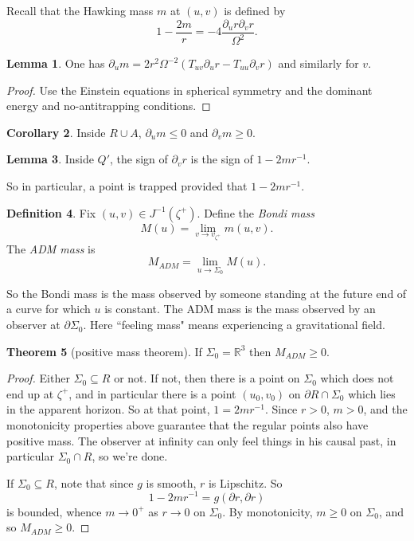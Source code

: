\documentclass[12pt]{report}
\newcommand{\RR}{\mathbb{R}}
\newcommand{\dfn}[1]{\emph{#1}\index{#1}}
\theoremstyle{definition}
\newtheorem{theorem}{Theorem}[chapter]
\newtheorem{lemma}[theorem]{Lemma}
\newtheorem{corollary}[theorem]{Corollary}
\newtheorem{definition}[theorem]{Definition}
\begin{document}
Recall that the Hawking mass $m$ at $(u, v)$ is defined by
$$1 - \frac{2m}{r} = -4 \frac{\partial_ur\partial_vr}{\Omega^2}.$$
\begin{lemma}
    One has $\partial_um = 2r^2\Omega^{-2} (T_{uv}\partial_ur - T_{uu}\partial_vr)$ and similarly for $v$.
\end{lemma}
\begin{proof}
    Use the Einstein equations in spherical symmetry and the dominant energy and no-antitrapping conditions.
\end{proof}
\begin{corollary}
    Inside $R \cup A$, $\partial_um \leq 0$ and $\partial_vm \geq 0$.
\end{corollary}
\begin{lemma}
    Inside $Q'$, the sign of $\partial_vr$ is the sign of $1 - 2mr^{-1}$.
\end{lemma}
    So in particular, a point is trapped provided that $1 - 2mr^{-1}$.
\begin{definition}
    Fix $(u, v) \in J^{-1}(\zeta^+)$. Define the \dfn{Bondi mass}
    $$M(u) = \lim_{v \to v_{\zeta^+}} m(u, v).$$
    The \dfn{ADM mass} is
    $$M_{ADM} = \lim_{u \to \Sigma_0} M(u).$$
\end{definition}
    So the Bondi mass is the mass observed by someone standing at the future end of a curve for which $u$ is constant. The ADM mass is the mass observed by an observer at $\partial \Sigma_0$. Here ``feeling mass" means experiencing a gravitational field.
\begin{theorem}[positive mass theorem]
    If $\Sigma_0 = \RR^3$ then $M_{ADM} \geq 0$.
\end{theorem}
\begin{proof}
    Either $\Sigma_0 \subseteq R$ or not. If not, then there is a point on $\Sigma_0$ which does not end up at $\zeta^+$, and in particular there is a point $(u_0, v_0)$ on $\partial R \cap \Sigma_0$ which lies in the apparent horizon. So at that point, $1 = 2mr^{-1}$. Since $r > 0$, $m > 0$, and the monotonicity properties above guarantee that the regular points also have positive mass. The observer at infinity can only feel things in his causal past, in particular $\Sigma_0 \cap R$, so we're done.

    If $\Sigma_0 \subseteq R$, note that since $g$ is smooth, $r$ is Lipschitz. So
    $$1 - 2mr^{-1} = g(\partial r, \partial r)$$
    is bounded, whence $m \to 0^+$ as $r \to 0$ on $\Sigma_0$. By monotonicity, $m \geq 0$ on $\Sigma_0$, and so $M_{ADM} \geq 0$.
\end{proof}
\end{document}
